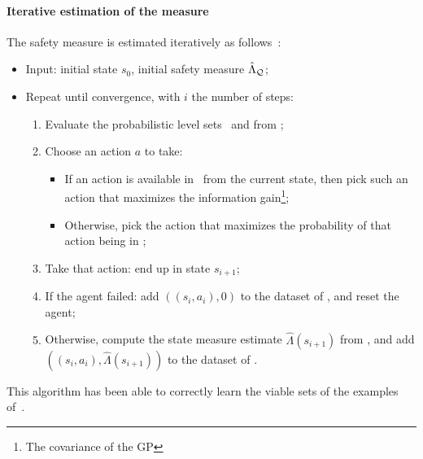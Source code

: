 	\paragraph{Iterative estimation of the measure} The safety measure is estimated iteratively as follows~\cite{heim2020learnable}:
	\begin{itemize}
		\item Input: initial state $s_0$, initial safety measure $\hat{\Lambda}_{\mathcal{Q}}$;
		\item Repeat until convergence, with $i$ the number of steps:
		\begin{enumerate}
			\item Evaluate the probabilistic level sets \Qopt~and \Qcaut from \LQhat;
			\item Choose an action $a$ to take:
			\begin{itemize}
				\item If an action is available in \Qcaut~from the current state, then pick such an action that maximizes the information gain\footnote{The covariance of the GP};
				\item Otherwise, pick the action that maximizes the probability of that action being in \Qcaut;
			\end{itemize}
			\item Take that action: end up in state $s_{i+1}$;
			\item If the agent failed: add $((s_i, a_i), 0)$ to the dataset of \LQhat, and reset the agent;
			\item Otherwise, compute the state measure estimate $\hat{\Lambda}(s_{i+1})$ from \Qopt, and add $((s_i, a_i), \hat{\Lambda}(s_{i+1}))$ to the dataset of \LQhat.
		\end{enumerate}
	\end{itemize}
	This algorithm has been able to correctly learn the viable sets of the examples of~\cite{heim2020learnable}.